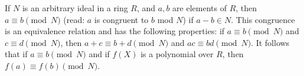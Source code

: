If $N$ is an arbitrary ideal in a ring $R$, and $a, b$ are elements of $R$, then $a \equiv b \pmod{N}$ (read: $a$ is congruent to $b$ mod $N$) if $a - b \in N$. This congruence is an equivalence relation and has the following properties: if $a \equiv b \pmod{N}$ and $c \equiv d \pmod{N}$, then $a + c \equiv b + d \pmod{N}$ and $ac \equiv bd \pmod{N}$. It follows that if $a \equiv b \pmod{N}$ and if $f(X)$ is a polynomial over $R$, then $f(a) \equiv f(b) \pmod{N}$.
